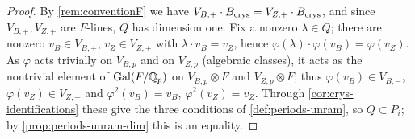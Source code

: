 \begin{proof}
  By \cref{rem:conventionF} we have \(V_{B,+} \cdot B_{\mathrm{crys}} = V_{Z,+} \cdot B_{\mathrm{crys}}\),
  and since \(V_{B,+}, V_{Z,+}\) are \(F\)-lines, \(Q\) has dimension one. Fix a
  nonzero \(\lambda \in Q\); there are nonzero \(v_B \in V_{B,+}\),
  \(v_Z \in V_{Z,+}\) with \(\lambda \cdot v_B = v_Z\), hence
  \(\varphi(\lambda) \cdot \varphi(v_B) = \varphi(v_Z)\). As \(\varphi\) acts
  trivially on \(V_{B,p}\) and on \(V_{Z,p}\) (algebraic classes), it acts as the
  nontrivial element of \(\mathrm{Gal}(F/\mathbb{Q}_p)\) on \(V_{B,p} \otimes F\) and
  \(V_{Z,p} \otimes F\); thus \(\varphi(v_B) \in V_{B,-}\),
  \(\varphi(v_Z) \in V_{Z,-}\) and \(\varphi^2(v_B) = v_B\),
  \(\varphi^2(v_Z) = v_Z\). Through \cref{cor:crys-identifications} these give
  the three conditions of \cref{def:periods-unram}, so \(Q \subset P_i\); by
  \cref{prop:periods-unram-dim} this is an equality.
\end{proof}

